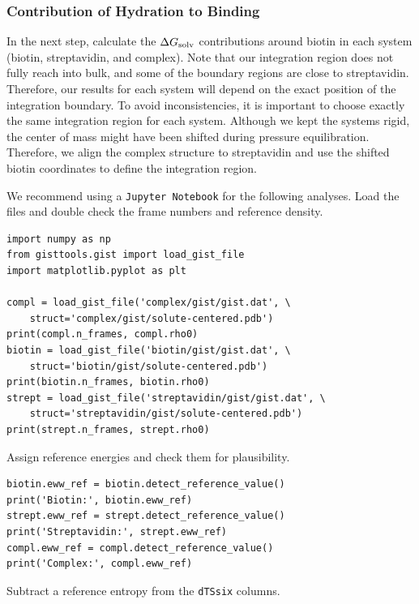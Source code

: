 \documentclass[9pt,tutorial]{livecoms}
\newcommand{\dgsolv}{\Delta G_\textup{solv}}
\newcommand{\software}{\texttt}
\newcommand\inlinecode{\texttt}
\begin{document}
\subsubsection{Contribution of Hydration to Binding}
\label{sec:binding_contributions}
In the next step, calculate the $\dgsolv$ contributions around biotin in each system (biotin, streptavidin, and complex).
Note that our integration region does not fully reach into bulk, and some of the boundary regions are close to streptavidin. 
Therefore, our results for each system will depend on the exact position of the integration boundary. 
To avoid inconsistencies, it is important to choose exactly the same integration region for each system.
Although we kept the systems rigid, the center of mass might have been shifted during pressure equilibration.
Therefore, we align the complex structure to streptavidin and use the shifted biotin coordinates to define the integration region.

We recommend using a \software{Jupyter Notebook} for the following analyses.
Load the files and double check the frame numbers and reference density.
\begin{lstlisting}[style=python]
import numpy as np
from gisttools.gist import load_gist_file
import matplotlib.pyplot as plt

compl = load_gist_file('complex/gist/gist.dat', \
    struct='complex/gist/solute-centered.pdb')
print(compl.n_frames, compl.rho0)
biotin = load_gist_file('biotin/gist/gist.dat', \
    struct='biotin/gist/solute-centered.pdb')
print(biotin.n_frames, biotin.rho0)
strept = load_gist_file('streptavidin/gist/gist.dat', \
    struct='streptavidin/gist/solute-centered.pdb')
print(strept.n_frames, strept.rho0)
\end{lstlisting}
Assign reference energies and check them for plausibility.

\begin{lstlisting}[style=python]
biotin.eww_ref = biotin.detect_reference_value()
print('Biotin:', biotin.eww_ref)
strept.eww_ref = strept.detect_reference_value()
print('Streptavidin:', strept.eww_ref)
compl.eww_ref = compl.detect_reference_value()
print('Complex:', compl.eww_ref)
\end{lstlisting}
\pagebreak %
Subtract a reference entropy from the \inlinecode{dTSsix} columns.
\end{document}
